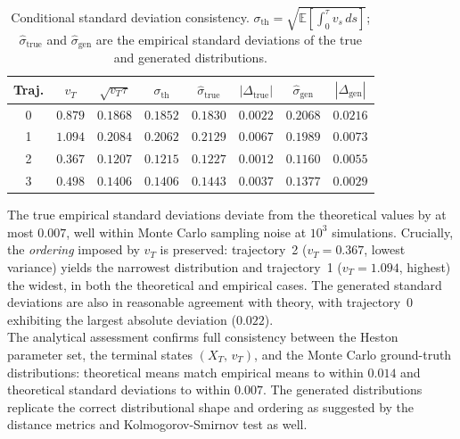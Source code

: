 \begin{table}[H]
\centering
\caption{Conditional standard deviation consistency.
$\sigma_{\mathrm{th}} = \sqrt{\mathbb{E}[\int_0^\tau v_s\,ds]}$;
$\hat{\sigma}_{\mathrm{true}}$ and $\hat{\sigma}_{\mathrm{gen}}$ are the
empirical standard deviations of the true and generated distributions.}
\label{tab:std_consistency}
\begin{tabular}{cccccccc}
\toprule
Traj. & $v_T$ & $\sqrt{v_T\tau}$ & $\sigma_{\mathrm{th}}$
      & $\hat{\sigma}_{\mathrm{true}}$ & $|\Delta_{\mathrm{true}}|$
      & $\hat{\sigma}_{\mathrm{gen}}$ & $|\Delta_{\mathrm{gen}}|$ \\
\midrule
0 & $0.879$ & $0.1868$ & $0.1852$ & $0.1830$ & $0.0022$ & $0.2068$ & $0.0216$ \\
1 & $1.094$ & $0.2084$ & $0.2062$ & $0.2129$ & $0.0067$ & $0.1989$ & $0.0073$ \\
2 & $0.367$ & $0.1207$ & $0.1215$ & $0.1227$ & $0.0012$ & $0.1160$ & $0.0055$ \\
3 & $0.498$ & $0.1406$ & $0.1406$ & $0.1443$ & $0.0037$ & $0.1377$ & $0.0029$ \\
\bottomrule
\end{tabular}
\end{table}

The true empirical standard deviations deviate from the theoretical values
by at most $0.007$, well within Monte Carlo sampling noise at $10^3$
simulations.  Crucially, the \emph{ordering} imposed by $v_T$ is preserved:
trajectory~2 ($v_T = 0.367$, lowest variance) yields the narrowest
distribution and trajectory~1 ($v_T = 1.094$, highest) the widest, in both
the theoretical and empirical cases.  The generated standard deviations are also
in reasonable agreement with theory, with trajectory~0 exhibiting the largest
absolute deviation ($0.022$).\\


The analytical assessment confirms full consistency between the Heston
parameter set, the terminal states $(X_T,\,v_T)$, and the Monte Carlo ground-truth
distributions: theoretical means match empirical means to within $0.014$ and
theoretical standard deviations to within $0.007$.  The generated distributions
replicate the correct distributional shape and ordering as suggested by the 
distance metrics and Kolmogorov-Smirnov test as well.\\


